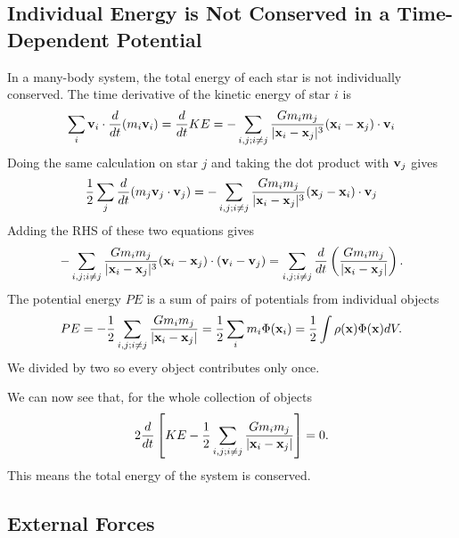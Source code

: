 \documentclass[]{article}
\begin{document}
\subsection{Individual Energy is Not Conserved in a Time-Dependent Potential}

In a many-body system, the total energy of each star is not individually conserved.
The time derivative of the kinetic energy of star $i$ is
\begin{equation}
\sum_{i} \mathbf{v}_i \cdot \frac{d}{dt} (m_i \mathbf{v}_i) = \frac{d}{dt} KE = -\sum_{i,j;i\ne j} \frac{Gm_i m_j}{|\mathbf{x}_i - \mathbf{x}_j|^{3}}(\mathbf{x}_i - \mathbf{x}_j) \cdot \mathbf{v}_i
\end{equation}
\noindent
Doing the same calculation on star $j$ and taking the dot product with $\mathbf{v}_j$ gives
\begin{equation}
\frac{1}{2}\sum_{j} \frac{d}{dt} (m_j \mathbf{v}_j \cdot \mathbf{v}_j) = - \sum_{i,j; i\ne j}\frac{Gm_i m_j}{|\mathbf{x}_i - \mathbf{x}_j|^{3}}(\mathbf{x}_j - \mathbf{x}_i)\cdot \mathbf{v}_j
\end{equation}
\noindent
Adding the RHS of these two equations gives
\begin{equation}
- \sum_{i,j; i\ne j}\frac{Gm_i m_j}{|\mathbf{x}_i - \mathbf{x}_j|^{3}}(\mathbf{x}_i - \mathbf{x}_j)\cdot(\mathbf{v}_i - \mathbf{v}_j) = \sum_{i,j;i\ne j}\frac{d}{dt}\left(\frac{Gm_i m_j}{|\mathbf{x}_i - \mathbf{x}_j|}\right).
\end{equation}
The potential energy $PE$ is a sum of pairs of potentials from individual objects
\begin{equation}
PE = -\frac{1}{2} \sum_{i,j;i\ne j}\frac{Gm_i m_j}{|\mathbf{x}_i - \mathbf{x}_j|} = \frac{1}{2} \sum_i m_i \Phi(\mathbf{x}_i) = \frac{1}{2} \int \rho(\mathbf{x})\Phi(\mathbf{x})dV.
\end{equation}
\noindent
We divided by two so every object contributes only once.

We can now see that, for the whole collection of objects 
\begin{equation}
2 \frac{d}{dt} \left[ KE - \frac{1}{2} \sum_{i,j;i\ne j} \frac{G m_i m_j}{|\mathbf{x}_i - \mathbf{x}_j|}\right] = 0.
\end{equation}
\noindent
This means the total energy of the system is conserved.

\subsection{External Forces}
\end{document}

